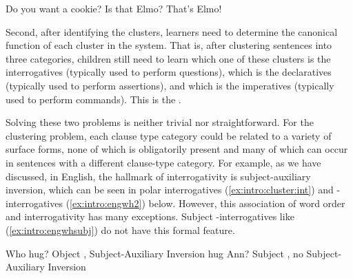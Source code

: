 Do you want a cookie?
\eex
{}
\bxl\label{ex:intro:cluster:int}
Is that Elmo?
\ex\label{ex:intro:cluster:dec}
That’s Elmo!
\exl
\eex

Second, after identifying the clusters, learners need to determine the canonical function of each cluster in the system. That is, after clustering sentences into three categories, children still need to learn which one of these clusters is the interrogatives (typically used to perform questions), which is the declaratives (typically used to perform assertions), and which is the imperatives (typically used to perform commands). This is the . %


Solving these two problems is neither trivial nor straightforward. For the clustering problem, each clause type category could be related to a variety of surface forms, none of which is obligatorily present and many of which can occur in sentences with a different clause-type category. For example, as we have discussed, in English, the hallmark of interrogativity is subject-auxiliary inversion, which can be seen in polar interrogatives (\ref{ex:intro:cluster:int}) and \twh-interrogatives (\ref{ex:intro:engwh2}) below. However, this association of word order and interrogativity has many exceptions. Subject \twh-interrogatives like (\ref{ex:intro:engwhsubj}) do not have this formal feature.


Who   hug? \hfill Object \twh{}, Subject-Auxiliary Inversion
\eex
{}
  hug Ann? \hfill Subject \twh{}, no Subject-Auxiliary Inversion
\eex

